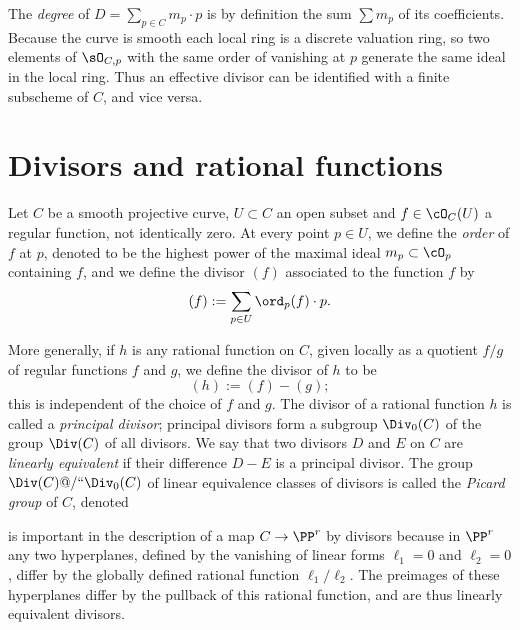 
The \emph{degree} of  $D = \sum_{p\in C} m_p\cdot p$ is by definition
%
the sum $\sum m_p$ of its coefficients. Because the curve is smooth
each local ring is a discrete valuation ring, so two elements of 
$\sO_{C,p}$ with the same order of vanishing at $p$ generate the same ideal in the local ring. Thus an effective divisor 
can be identified with a finite subscheme of $C$, and vice versa.

\section{Divisors and rational functions}

Let $C$ be a smooth projective curve, $U \subset C$ an open subset and
$f \in \cO_C(U)$ a regular function, not identically zero. At every
point $p \in U$, we define the \emph{order} of $f$ at $p$, denoted
%
%
to be the highest power of the maximal ideal $m_p \subset
\cO_p$ containing $f$, and we define the divisor $(f)$ associated to
%
the function $f$ by 
$$
(f) := \sum_{p \in U} \ord_p(f) \cdot p.
$$

More generally, if $h$ is any rational function on $C$, given locally as a quotient $f/g$ of regular functions $f$ and $g$, we define the divisor of $h$ to be
$$
(h) := (f) - (g);
$$
%
this is independent of the choice of $f$ and $g$. The divisor of a
%
rational function $h$ is called a \emph{principal divisor}; principal
divisors form a subgroup $\Div_0(C)$ of the group $\Div(C)$ of all
divisors. We say that two divisors $D$ and $E$ on $C$ are
\emph{linearly equivalent} if their difference $D-E$ is a principal
divisor. The group $\Div(C)@/` `\Div_0(C)$ of linear equivalence classes
%
of divisors is called the \emph{Picard group} of $C$, denoted
%

%
is important in the description of a map $C\to \PP^{r}$ by divisors
because in $\PP^{r}$ any two hyperplanes, defined by the vanishing of linear forms  $\ell_{1}=0$ and $\ell_{2}=0$, differ by the globally defined rational
function $\ell_{1}/\ell_{2}$. The preimages of these hyperplanes
differ by the 
pullback of this rational function,
and are thus linearly equivalent divisors.

